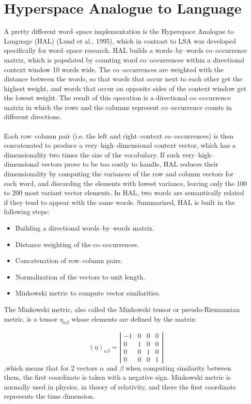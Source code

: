 \section{Hyperspace Analogue to Language}
A pretty different word--space implementation is the Hyperspace Analogue to Language (HAL) (Lund et al., 1995)\cite{lund1995}, which in contrast to LSA was developed specifically for word--space research. HAL builds a words--by--words co--occurrence matrix, which is populated by counting word co--occurrences within a directional context window 10 words wide. The co--occurrences are weighted with the distance between the words, so that words that occur next to each other get the highest weight, and words that occur on opposite sides of the context window get the lowest weight. The result of this operation is a directional co--occurrence matrix in which the rows and the columns represent co--occurrence counts in different directions.
\\\\  Each row--column pair (i.e. the left and right--context co--occurrences) is then concatenated to produce a very--high--dimensional context vector, which has a dimensionality two times the size of the vocabulary. If such very--high--dimensional vectors prove to be too costly to handle, HAL reduces their dimensionality by computing the variances of the row and column vectors for each word, and discarding the elements with lowest variance, leaving only the 100 to 200 most variant vector elements. In HAL,  two words are semantically related if they tend to appear with the same words.
Summarized, HAL is built in the following steps:
\begin{itemize}
\item Building a directional words--by--words matrix.
\item Distance weighting of the co--occurrences.
\item Concatenation of row--column pairs.
\item Normalization of the vectors to unit length.
\item Minkowski metric to compute vector similarities.
\end{itemize}

The Minkowski metric, also called the Minkowski tensor or pseudo-Riemannian metric, is a tensor  $\eta_{\alpha\beta}$ whose elements are defined by the matrix:

\[  (\eta)_{\alpha\beta}=\left
|\begin{array}{cccc}
-1 & 0 & 0 & 0 \\
0 & 1& 0 & 0  \\
0 & 0& 1 & 0  \\
0 & 0& 0 & 1   \end{array} \right| \]
,which means that for 2 vectors $\alpha$ and $\beta$ when computing similarity between them, the first 
coordinate is taken with a negative sign. Minkowski metric is normally used in physics, in theory of relativity, and
there the first coordinate represents the time dimension.


